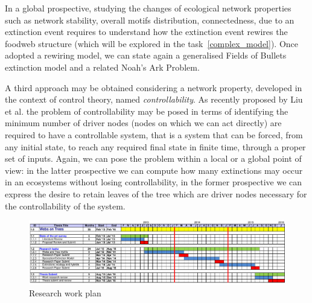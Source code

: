 \documentclass[12pt,a4paper]{report}
\begin{document}
In a global prospective, studying the changes of ecological network properties such as network stability, overall motifs distribution, connectedness, due to an extinction event requires to understand how the extinction event rewires the foodweb structure (which will be explored in the task~\ref{complex_model}). Once adopted a rewiring model, we can state again a generalised Fields of Bullets extinction model and a related Noah's Ark Problem.

A third approach may be obtained considering a network property, developed in the context of control theory, named \emph{controllability}. As recently proposed by Liu et al. \cite{liu2011controllability} the problem of controllability may be posed in terms of identifying the minimum number of driver nodes (nodes on which we can act directly) are required to have a controllable system, that is a system that can be forced, from any initial state, to reach any required final state in finite time, through a proper set of inputs. Again, we can pose the problem within a local or a global point of view: in the latter prospective we can compute how many extinctions may occur in an ecosystems without losing controllability, in the former prospective we can express the desire to retain leaves of the tree which are driver nodes necessary for the controllability of the system.

\begin{small}


\end{small}

\newpage

\begin{figure}[t]
   \begin{center}
   	\includegraphics[height=0.27\textheight, angle=90]{images/PhD_gantt_center}
   	\caption{Research work plan}
    \end{center}
\end{figure}
\end{document}
